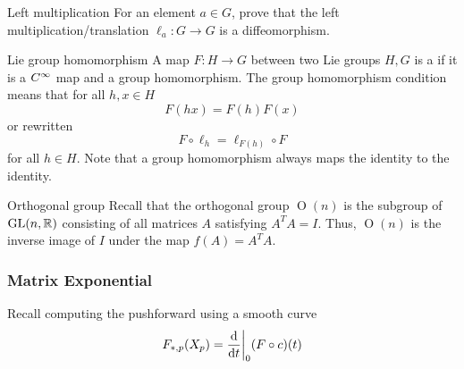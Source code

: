\begin{example}{Left multiplication}{}
    For an element \(a \in G\), prove that the left multiplication/translation \(\ell_a \colon G \rightarrow G\) is a diffeomorphism.
\end{example}
\begin{definition}{Lie group homomorphism}{}
    A map \(F \colon H \rightarrow G\) between two Lie groups \(H, G\) is a  if it is a \(C^\infty\) map and a group homomorphism.
    The group homomorphism condition means that for all  \(h,x \in H\)
    \[
        F(hx) = F(h)F(x)    
    \]
    or rewritten 
    \[
        F \circ \ell_h = \ell_{F(h)} \circ F
    \]
    for all \(h \in H\).
    Note that a group homomorphism always maps the identity to the identity.
\end{definition}

\begin{definition}{Orthogonal group}{}
    Recall that the orthogonal group \(\operatorname{O}(n)\) is the subgroup of \(\operatorname{GL}(n, \mathbb{R})\) consisting of all matrices \(A\) satisfying \(A^T A = I\).
    Thus, \(\operatorname{O}(n)\) is the inverse image of \(I\) under the map \(f(A) = A^T A\).
\end{definition}

\subsubsection{Matrix Exponential}

Recall computing the pushforward using a smooth curve 
\[
    F_{*,p} (X_p) = \evalat[\bigg]{\dv{t}}{0} (F \circ c)(t)    
\]

